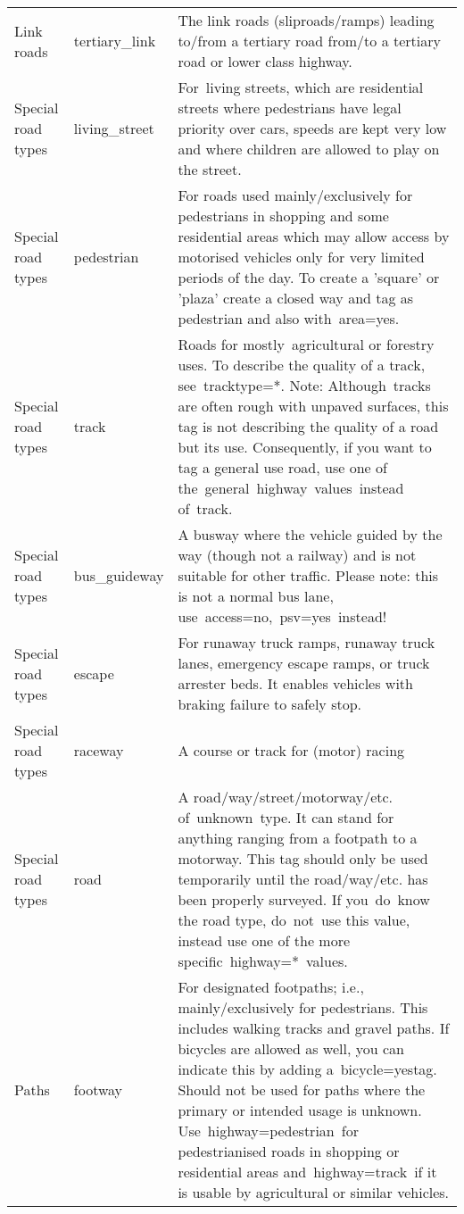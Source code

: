 \begin{tabular}{lll}
  Link roads & tertiary\_link & The link roads (sliproads/ramps) leading to/from a tertiary road from/to a tertiary road or lower class highway. \\ 
  Special road types & living\_street & For living streets, which are residential streets where pedestrians have legal priority over cars, speeds are kept very low and where children are allowed to play on the street. \\ 
  Special road types & pedestrian & For roads used mainly/exclusively for pedestrians in shopping and some residential areas which may allow access by motorised vehicles only for very limited periods of the day. To create a 'square' or 'plaza' create a closed way and tag as pedestrian and also with area=yes. \\ 
  Special road types & track & Roads for mostly agricultural or forestry uses. To describe the quality of a track, see tracktype=*. Note: Although tracks are often rough with unpaved surfaces, this tag is not describing the quality of a road but its use. Consequently, if you want to tag a general use road, use one of the general highway values instead of track. \\ 
  Special road types & bus\_guideway & A busway where the vehicle guided by the way (though not a railway) and is not suitable for other traffic. Please note: this is not a normal bus lane, use access=no, psv=yes instead! \\ 
  Special road types & escape & For runaway truck ramps, runaway truck lanes, emergency escape ramps, or truck arrester beds. It enables vehicles with braking failure to safely stop. \\ 
  Special road types & raceway & A course or track for (motor) racing \\ 
  Special road types & road & A road/way/street/motorway/etc. of unknown type. It can stand for anything ranging from a footpath to a motorway. This tag should only be used temporarily until the road/way/etc. has been properly surveyed. If you do know the road type, do not use this value, instead use one of the more specific highway=* values. \\ 
  Paths & footway & For designated footpaths; i.e., mainly/exclusively for pedestrians. This includes walking tracks and gravel paths. If bicycles are allowed as well, you can indicate this by adding a bicycle=yestag. Should not be used for paths where the primary or intended usage is unknown. Use highway=pedestrian for pedestrianised roads in shopping or residential areas and highway=track if it is usable by agricultural or similar vehicles. \\ 

\end{tabular}
